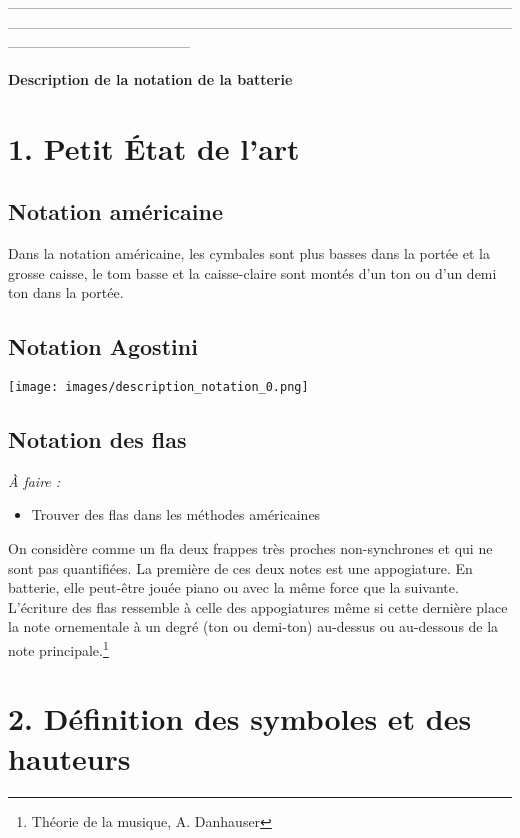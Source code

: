 —————————————————————————————————————————————————————————————————————————————————————
\begin{center}
	\textbf{\LARGE{Description de la notation de la batterie}}
\end{center}
\section*{1. Petit État de l’art}
\subsection*{Notation américaine}
Dans la notation américaine, les cymbales sont plus basses dans la portée et la grosse caisse, le tom basse et la caisse-claire sont montés d’un ton ou d’un demi ton dans la portée.
\subsection*{Notation Agostini}
\texttt{[image: images/description\_notation\_0.png]}
\subsection*{Notation des flas}
\textit{À faire :}
\begin{itemize}
	\item Trouver des flas dans les méthodes américaines\\
\end{itemize}
On considère comme un fla deux frappes très proches non-synchrones et qui ne sont pas quantifiées. La première de ces deux notes est une appogiature. En batterie, elle peut-être jouée piano ou avec la même force que la suivante.
L’écriture des flas ressemble à celle des appogiatures même si cette dernière place la note ornementale à un degré (ton ou demi-ton) au-dessus ou au-dessous de la note principale.\footnote{Théorie de la musique, A. Danhauser}
\section*{2. Définition des symboles et des hauteurs}
